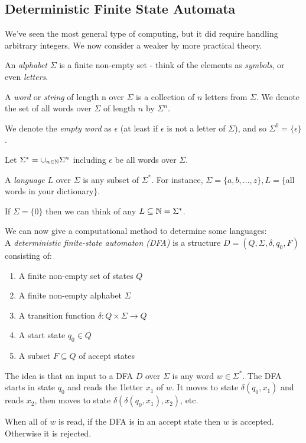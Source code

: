 \documentclass[10pt,a4paper]{article}
\begin{document}
\subsection*{Deterministic Finite State Automata}
We've seen the most general type of computing, but it did require handling arbitrary integers. We now consider a weaker by more practical theory.

An \emph{alphabet} $\Sigma$ is a finite non-empty set - think of the elements as \emph{symbols}, or even \emph{letters}. 

A \emph{word} or \emph{string} of length n over $\Sigma$ is a collection of $n$ letters from $\Sigma$. We denote the set of all words over $\Sigma$ of length $n$ by $\Sigma^n$.

We denote the \emph{empty word} as $\epsilon$ (at least if $\epsilon$ is not a letter of $\Sigma$), and so $\Sigma^0 = \{\epsilon\}$.

Let $\Sigma^\ast = \cup_{n\in\mathbb{N}} \Sigma^n$ including $\epsilon$ be all words over $\Sigma$.

A \emph{language} $L$ over $\Sigma$ is any subset of $\Sigma^\ast$. For instance, $\Sigma = \{a,b,\ldots,z\}, L = \{$all words in your dictionary$\}$.

If $\Sigma = \{0\}$ then we can think of any $L \subseteq \mathbb{N} = \Sigma^\ast$.

We can now give a computational method to determine some languages:\\
A \emph{deterministic finite-state automaton (DFA)} is a structure $D = (Q, \Sigma, \delta, q_0, F)$ consisting of:
\begin{enumerate}
\item A finite non-empty set of states $Q$
\item A finite non-empty alphabet $\Sigma$
\item A transition function $\delta: Q \times \Sigma \to Q$
\item A start state $q_0 \in Q$
\item A subset $F \subseteq Q$ of accept states
\end{enumerate}
The idea is that an input to a DFA $D$ over $\Sigma$ is any word $w \in \Sigma^\ast$. The DFA starts in state $q_0$ and reads the 1\th[st] letter $x_1$ of $w$. It moves to state $\delta(q_0, x_1)$ and reads $x_2$, then moves to state $\delta(\delta(q_0, x_1),x_2)$, etc.

When all of $w$ is read, if the DFA is in an accept state then $w$ is accepted. Otherwise it is rejected.
\newpage
\end{document}

